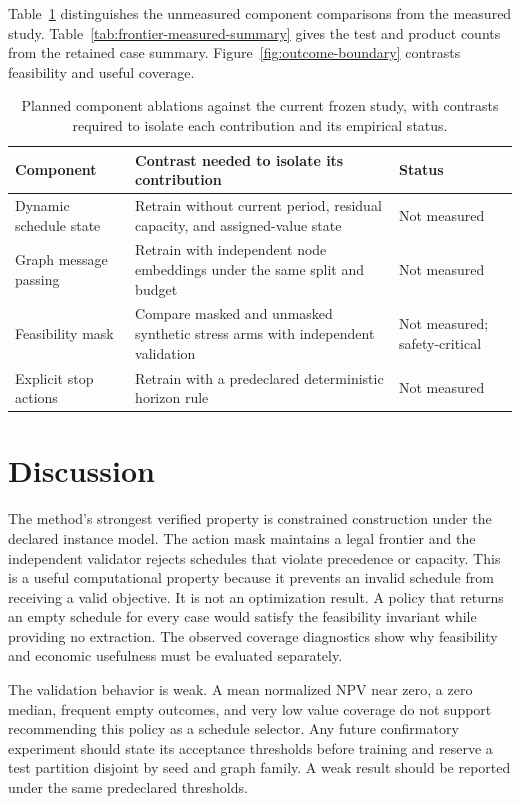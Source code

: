 \documentclass[11pt]{article}
\begin{document}
Table~\ref{tab:ablation-status} distinguishes the unmeasured component comparisons from the measured study. Table~\ref{tab:frontier-measured-summary} gives the test and product counts from the retained case summary. Figure~\ref{fig:outcome-boundary} contrasts feasibility and useful coverage.
\begin{table}[ht]
\centering\small
\caption{Planned component ablations against the current frozen study, with contrasts required to isolate each contribution and its empirical status.}
\label{tab:ablation-status}
\begin{tabular}{>{\raggedright\arraybackslash}p{}>{\raggedright\arraybackslash}p{}>{\raggedright\arraybackslash}p{}}
\toprule Component & Contrast needed to isolate its contribution & Status \\ \midrule
Dynamic schedule state & Retrain without current period, residual capacity, and assigned-value state & Not measured \\
Graph message passing & Retrain with independent node embeddings under the same split and budget & Not measured \\
Feasibility mask & Compare masked and unmasked synthetic stress arms with independent validation & Not measured; safety-critical \\
Explicit stop actions & Retrain with a predeclared deterministic horizon rule & Not measured \\
\bottomrule
\end{tabular}
\end{table}



\section{Discussion}
The method's strongest verified property is constrained construction under the declared instance model. The action mask maintains a legal frontier and the independent validator rejects schedules that violate precedence or capacity. This is a useful computational property because it prevents an invalid schedule from receiving a valid objective. It is not an optimization result. A policy that returns an empty schedule for every case would satisfy the feasibility invariant while providing no extraction. The observed coverage diagnostics show why feasibility and economic usefulness must be evaluated separately.

The validation behavior is weak. A mean normalized NPV near zero, a zero median, frequent empty outcomes, and very low value coverage do not support recommending this policy as a schedule selector. Any future confirmatory experiment should state its acceptance thresholds before training and reserve a test partition disjoint by seed and graph family. A weak result should be reported under the same predeclared thresholds.
\end{document}
